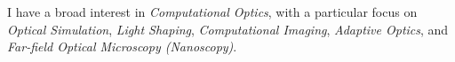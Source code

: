 I have a broad interest in \textit{Computational Optics}, with a particular focus on \textit{Optical Simulation}, \textit{Light Shaping}, \textit{Computational Imaging}, \textit{Adaptive Optics}, and \textit{Far-field Optical Microscopy (Nanoscopy)}.